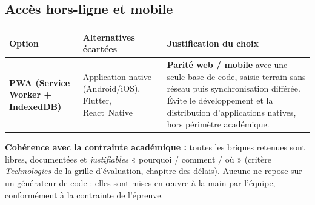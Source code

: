 \subsection{Accès hors-ligne et mobile}
\begin{xltabular}{\textwidth}{>{\bfseries}p{2.7cm} p{4.2cm} X}
\toprule
\textbf{Option} & \textbf{Alternatives écartées} & \textbf{Justification du choix} \\
\midrule
\endhead
PWA (Service Worker + IndexedDB) & Application native (Android/iOS), Flutter, React~Native & \textbf{Parité web / mobile} avec une seule base de code, saisie terrain sans réseau puis synchronisation différée. Évite le développement et la distribution d'applications natives, hors périmètre académique. \\
\bottomrule
\end{xltabular}

\begin{encadre}
\textbf{Cohérence avec la contrainte académique :} toutes les briques retenues
sont libres, documentées et \emph{justifiables} « pourquoi / comment / où »
(critère \emph{Technologies} de la grille d'évaluation, chapitre des délais).
Aucune ne repose sur un générateur de code : elles sont mises en \oe uvre à la
main par l'équipe, conformément à la contrainte de l'épreuve.
\end{encadre}

